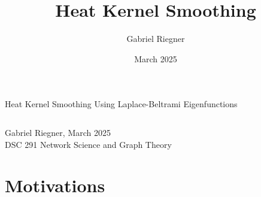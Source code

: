 \documentclass[8pt]{beamer}
\title{Heat Kernel Smoothing}
\author[]{Gabriel Riegner}
\date{March 2025}
\begin{document}
\begin{frame}{Heat Kernel Smoothing Using Laplace-Beltrami Eigenfunctions\\ \citep*{seo_heat_2010}}
\small
\begin{columns}
\tableofcontents[hideallsubsections]
\end{columns}
\vfill\centering
Gabriel Riegner, March 2025\\
DSC 291 Network Science and Graph Theory
\end{frame}

\section{Motivations}

\end{document}
